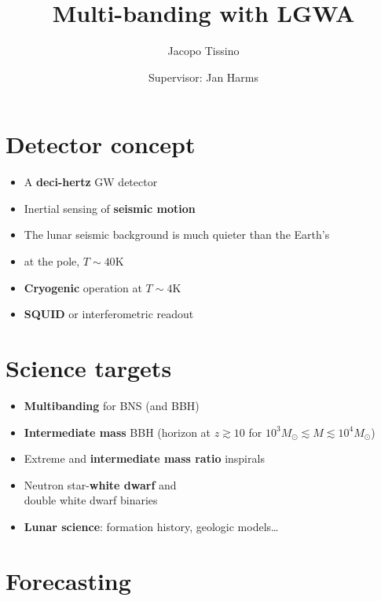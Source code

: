 \documentclass[a0paper,fleqn]{betterposter}
\begin{document}
{\title{Multi-banding with LGWA}
\author{Jacopo Tissino}
\author{Supervisor: Jan Harms}
\vspace{5mm}

\vspace{10mm}
\section{Detector concept}
\vspace{-1cm}

\begin{itemize}
    \item A \textbf{deci-hertz} GW detector
    \item Inertial sensing of \textbf{seismic motion}
    \item The lunar seismic background is much quieter than the Earth's
    \item {} at the pole, $T\sim 40 \text{K}$
    \item \textbf{Cryogenic} operation at $T\sim 4 \text{K}$
    \item \textbf{SQUID} or interferometric readout
\end{itemize}

\vspace{20mm}
\section{Science targets}
\vspace{-1cm}

\begin{itemize}
    \item \textbf{Multibanding} for BNS (and BBH)
    \item \textbf{Intermediate mass} BBH (horizon at \(z \gtrsim 10\) for $10^3 M_{\odot} \lesssim M \lesssim 10^4 M_{\odot}$)
    \item Extreme and \textbf{intermediate mass ratio} inspirals
    \item Neutron star-\textbf{white dwarf} and \\ double white dwarf binaries
    \item \textbf{Lunar science}: formation history, geologic models\dots
\end{itemize}

\vspace{20mm}
\section{Forecasting}
\vspace{-1cm}

}
\end{document}
